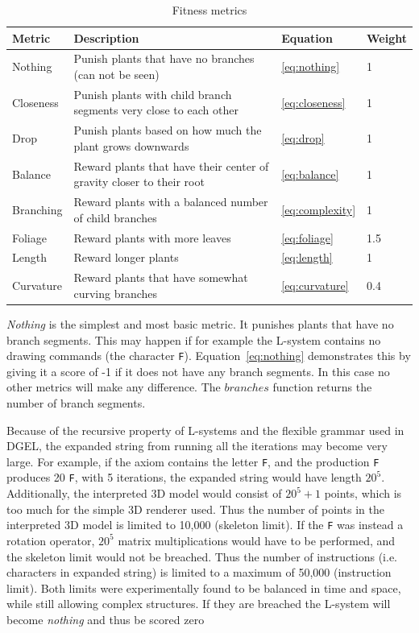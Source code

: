 \begin{table}
    \centering
    \begin{tabularx}{\textwidth}{| l | X | l | l |}
    \hline
    \textbf{Metric} & \textbf{Description} & \textbf{Equation} & \textbf{Weight} \\
    \hline
    Nothing & Punish plants that have no branches (can not be seen) & \ref{eq:nothing} & 1 \\
    \hline
    Closeness & Punish plants with child branch segments very close to each other & \ref{eq:closeness} & 1 \\
    \hline
    Drop & Punish plants based on how much the plant grows downwards & \ref{eq:drop} & 1 \\
    \hline
    Balance & Reward plants that have their center of gravity closer to their root & \ref{eq:balance} & 1 \\
    \hline
    Branching & Reward plants with a balanced number of child branches & \ref{eq:complexity} & 1 \\
    \hline
    Foliage & Reward plants with more leaves & \ref{eq:foliage} & 1.5 \\
    \hline
    Length & Reward longer plants & \ref{eq:length} & 1 \\
    \hline
    Curvature & Reward plants that have somewhat curving branches & \ref{eq:curvature} & 0.4 \\
    \hline
    \end{tabularx}
    \caption{Fitness metrics}
    \label{tab:fitness}
\end{table}

\textit{Nothing} is the simplest and most basic metric.
It punishes plants that have no branch segments.
This may happen if for example the L-system contains no drawing commands (the character \texttt{F}).
Equation~\ref{eq:nothing} demonstrates this by giving it a score of -1 if it does not have any branch segments.
In this case no other metrics will make any difference.
The $branches$ function returns the number of branch segments.

Because of the recursive property of L-systems and the flexible grammar used in DGEL, the expanded string from running all the iterations may become very large.
For example, if the axiom contains the letter \texttt{F}, and the production \texttt{F} produces 20 \texttt{F}, with 5 iterations, the expanded string would have length $20^5$.
Additionally, the interpreted 3D model would consist of $20^5 + 1$ points, which is too much for the simple 3D renderer used.
Thus the number of points in the interpreted 3D model is limited to 10,000 (skeleton limit).
If the \texttt{F} was instead a rotation operator, $20^5$ matrix multiplications would have to be performed, and the skeleton limit would not be breached.
Thus the number of instructions (i.e. characters in expanded string) is limited to a maximum of 50,000 (instruction limit).
Both limits were experimentally found to be balanced in time and space, while still allowing complex structures.
If they are breached the L-system will become \textit{nothing} and thus be scored zero

